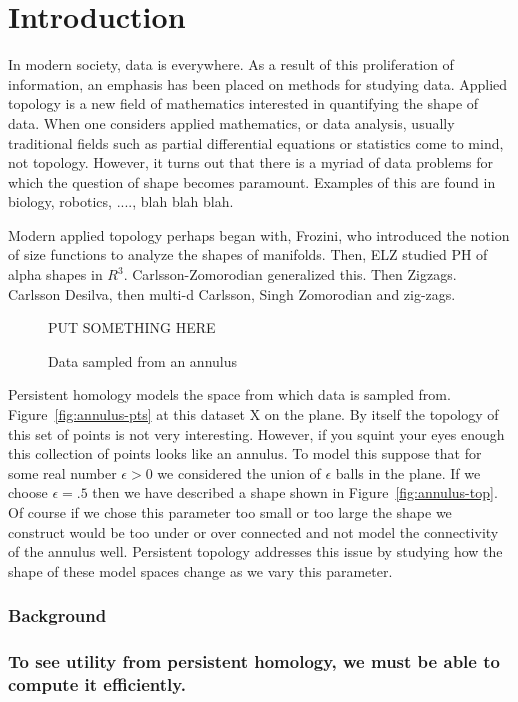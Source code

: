 



\chapter{Introduction}
In modern society, data is everywhere. As a result of this proliferation of information, an emphasis has been placed on methods for studying data.
Applied topology is a new field of mathematics interested in quantifying the shape of data. When one considers applied mathematics, or
data analysis, usually traditional fields such as partial differential equations or statistics come to mind, not topology. However, it turns out that
there is a myriad of data problems for which the question of shape becomes paramount. Examples of this are found in biology, robotics, ...., blah blah blah.

Modern applied topology perhaps began with, Frozini, who introduced the notion of size functions to analyze the shapes of manifolds. 
Then, ELZ studied PH of alpha shapes in $R^3$. Carlsson-Zomorodian generalized this. Then Zigzags. Carlsson Desilva,  
then multi-d Carlsson, Singh Zomorodian and zig-zags.

\begin{figure}
PUT SOMETHING HERE
\caption{Data sampled from an annulus}
\cite{fig:annulus}
\end{figure}
Persistent homology models the space from which data is sampled from. Figure~\ref{fig:annulus-pts} at this dataset X on the plane. By itself the topology of this set of points is not very interesting. However, if you squint your eyes enough this collection of points looks like an annulus. To model this suppose that for some real number $\epsilon > 0$ we considered the union of $\epsilon$ balls in the plane. If we choose $\epsilon = .5$ then we have described a shape shown in Figure~\ref{fig:annulus-top}. Of course if we chose this parameter too small or too large the shape we construct would be too under or over connected and not model the connectivity of the annulus well. Persistent topology addresses this issue by studying how the shape of these model spaces change as we vary this parameter. 



\subsection{Background}
\subsection{To see utility from persistent homology, we must be able to compute it efficiently.}